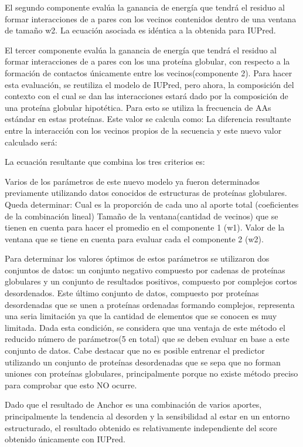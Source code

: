 El segundo componente evalúa la ganancia de energía que tendrá el residuo al formar interacciones de a pares con los vecinos contenidos dentro de una ventana de tamaño w2. 
La ecuación asociada es idéntica a la obtenida para IUPred.

El tercer componente evalúa la ganancia de energía que tendrá el residuo al formar interacciones de a pares con los una proteína globular, con respecto a la formación de contactos únicamente entre los vecinos(componente 2). Para hacer esta evaluación, se reutiliza el modelo de IUPred, pero ahora, la composición del contexto con el cual se dan las interacciones estará dado por la composición de una proteína globular hipotética. Para esto se utiliza la frecuencia de AAs estándar en estas proteínas. Este valor se calcula como:
La diferencia resultante entre la interacción con los vecinos propios de la secuencia y este nuevo valor calculado será:
    

La ecuación resultante que combina los tres criterios es:

  
  
Varios de los parámetros de este nuevo modelo ya fueron determinados previamente utilizando datos conocidos de estructuras de proteínas globulares. Queda determinar:
Cual es la proporción de cada uno al aporte total (coeficientes de la combinación lineal) 
Tamaño de la ventana(cantidad de vecinos) que se tienen en cuenta para hacer el promedio en el componente 1 (w1).
Valor de la ventana que se tiene en cuenta para evaluar cada el componente 2 (w2).

Para determinar los valores óptimos de estos parámetros se utilizaron dos conjuntos de datos: un conjunto negativo compuesto por cadenas de proteínas globulares y un conjunto de resultados
positivos, compuesto por complejos cortos desordenados. Este último conjunto de datos, compuesto por proteínas desordenadas que se unen a proteínas ordenadas formando complejos,
representa una seria limitación ya que la cantidad de elementos que se conocen es muy limitada. Dada esta condición, se considera que una ventaja de este método el reducido número de 
parámetros(5 en total) que se deben evaluar en base a este conjunto de datos.
Cabe destacar que no es posible entrenar el predictor utilizando un conjunto de proteínas desordenadas que se sepa que no forman uniones con proteínas globulares, principalmente 
porque no existe método preciso para comprobar que esto NO ocurre.

Dado que el resultado de Anchor es una combinación de varios aportes, principalmente la tendencia al desorden y la sensibilidad al estar en un entorno estructurado, 
el resultado obtenido es relativamente independiente del score obtenido únicamente con IUPred. 

